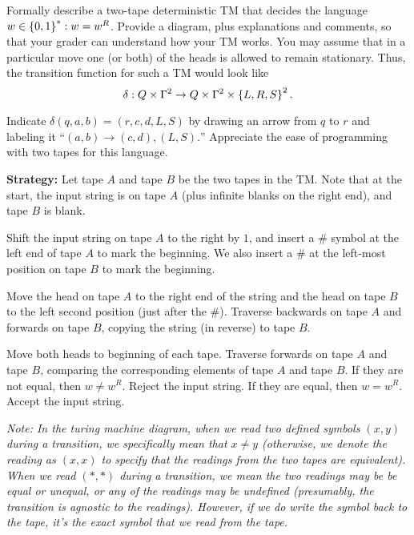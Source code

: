\begin{problem}
  Formally describe a two-tape deterministic TM that decides the language
  ${w \in \left\{0,1\right\}^* : w = w^R}$.
  Provide a diagram, plus explanations and comments,
  so that your grader can understand how your TM works.
  You may assume that in a particular move one (or both)
  of the heads is allowed to remain stationary.
  Thus, the transition function for such a TM would look like
  \[ \delta : Q \times \Gamma^2 \to Q \times \Gamma^2 \times \left\{L, R, S\right\}^2. \]

  \step
  Indicate $\delta(q, a , b) = (r, c, d, L, S)$ by drawing an arrow from
  $q$ to $r$ and labeling it
  ``$(a, b) \to (c, d), (L, S).$''
  Appreciate the ease of programming with two tapes for this language.
\end{problem}
\begin{Answer}
  \textbf{Strategy:}
  Let tape $A$ and tape $B$ be the two tapes in the TM.
  Note that at the start, the input string is on tape $A$
  (plus infinite blanks on the right end), and tape $B$ is blank.

  \begin{enumroman}
    \item Shift the input string on tape $A$ to the right by $1$, and insert
      a $\#$ symbol at the left end of tape $A$ to mark the beginning.
      We also insert a $\#$ at the left-most position on tape $B$ to mark the beginning.

    \item Move the head on tape $A$ to the right end of the string
      and the head on tape $B$ to the left second position (just after the $\#$).
      Traverse backwards on tape $A$ and forwards on tape $B$,
      copying the string (in reverse) to tape $B$.
    \item Move both heads to beginning of each tape.
      Traverse forwards on tape $A$ and tape $B$,
      comparing the corresponding elements of tape $A$ and tape $B$.
      If they are not equal, then $w \neq w^R$. Reject the input string.
      If they are equal, then $w = w^R$. Accept the input string.
  \end{enumroman}

  \newpage
  \emph{
    Note: In the turing machine diagram,
    when we read two defined symbols $(x, y)$ during a transition,
    we specifically mean that $x \neq y$
    (otherwise, we denote the reading as $(x, x)$
    to specify that the readings from the two tapes are equivalent).
    When we read $(*, *)$ during a transition,
    we mean the two readings may be be equal or unequal,
    or any of the readings may be undefined (presumably, the transition
    is agnostic to the readings). However, if we do write the symbol
    back to the tape, it's the exact symbol that we read from the tape.
  }


\end{Answer}
